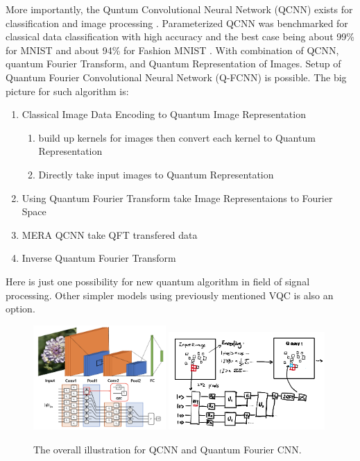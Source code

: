 \documentclass{article}
\begin{document}
More importantly, the Quntum Convolutional Neural Network (QCNN) exists for 
classification and image processing \cite{qml_cnn}. Parameterized 
QCNN was benchmarked for classical data classification with 
high accuracy and the best case being about 99\% for MNIST and 
about 94\% for Fashion MNIST \cite{qml_cnn1} \cite{qml_cnn2}. 
With combination of QCNN, quantum Fourier Transform, and Quantum 
Representation of Images. Setup of Quantum Fourier Convolutional Neural Network (Q-FCNN)
is possible. The big picture for such algorithm is:
\begin{enumerate}
  \item Classical Image Data Encoding to Quantum Image Representation
  \begin{enumerate}
    \item build up kernels for images then convert each kernel to Quantum Representation
    \item Directly take input images to Quantum Representation
  \end{enumerate}
  \item Using Quantum Fourier Transform take Image Representaions to Fourier Space
  \item MERA QCNN take QFT transfered data \cite{qml_cnn_tutorial} \cite{tensorflow}
  \item Inverse Quantum Fourier Transform
\end{enumerate}

Here is just one possibility for new quantum algorithm in field of signal processing. Other
simpler models using previously mentioned VQC is also an option. 

\begin{figure}[h]
  \begin{center}
    \includegraphics[width=0.45\textwidth]{qcnn.png}
    \includegraphics[width=0.53\textwidth]{qfcnn.png}
  \end{center}
  \caption{
 The overall illustration for QCNN and Quantum Fourier CNN. 
  \cite{manifold2}}
  \label{qfcnn}
\end{figure}
\end{document}
